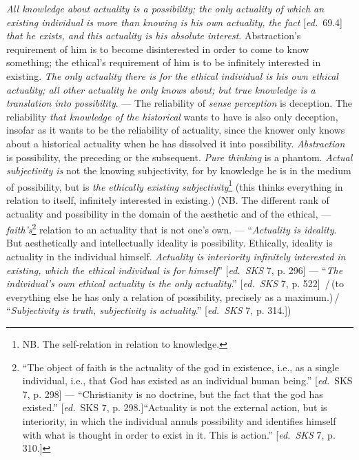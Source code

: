 \documentclass[12pt,a4paper,openany]{book}
\newcommand{\ed}[1]{{\small[\textit{ed.}\ #1]}}
\newcommand{\ins}[1]{\,/\,#1\,/\,}
\begin{document}
\emph{All knowledge about actuality is a possibility; the only actuality of which an existing individual
is more than knowing is his own actuality, the fact} \ed{69.4} \emph{that he exists, and
this actuality is his absolute interest}. Abstraction's requirement of
him is to become disinterested in order to come to know something; the ethical's
requirement of him is to be infinitely interested in existing. \emph{The
only actuality there is for the ethical individual is his own ethical actuality; all other actuality
he only knows about; but true knowledge is a translation into possibility}. ---
The reliability of \emph{sense perception} is deception. The reliability \emph{that
knowledge of the historical} wants to have is also only deception, insofar as it
wants to be the reliability of actuality, since the knower only
knows about a historical actuality when he has dissolved it into possibility.
\emph{Abstraction} is possibility, the preceding or the subsequent.
\emph{Pure thinking} is a phantom. \emph{Actual subjectivity is}
not the knowing subjectivity, for by knowledge he is in the medium of possibility, but
is \emph{the ethically existing subjectivity}\footnote[46]{NB. The self-relation in relation to knowledge.} (this thinks everything in relation to itself,
infinitely interested in existing.) (NB. The different rank of actuality and possibility
in the domain of the aesthetic and of the ethical, --- \emph{faith's}\footnote[47]{``The object of faith is the actuality of the god in existence, i.e., as a single individual,
i.e., that God has existed as an individual human being.'' \ed{SKS 7, p. 298} --- ``Christianity
is no doctrine, but the fact that the god has existed.'' \ed{SKS 7, p. 298.}``Actuality
is not the external action, but is interiority, in which the individual
annuls possibility and identifies himself with what is thought in order to exist in it. This
is action.'' \ed{\emph{SKS} 7, p. 310.}}
relation to an actuality that is not one's own.
--- ``\emph{Actuality is ideality}. But aesthetically and intellectually ideality is
possibility. Ethically, ideality is actuality in the individual
himself. \emph{Actuality is interiority infinitely interested in existing, which the
ethical individual is for himself}'' \ed{\emph{SKS} 7, p. 296} --- ``\emph{The individual's own ethical actuality
is the only actuality}.'' \ed{\emph{SKS} 7, p. 522} \ins{(to everything else he has
only a relation of possibility, precisely as a maximum.)} ``\emph{Subjectivity is
truth, subjectivity is actuality}.'' \ed{\emph{SKS} 7, p. 314.})
\end{document}
